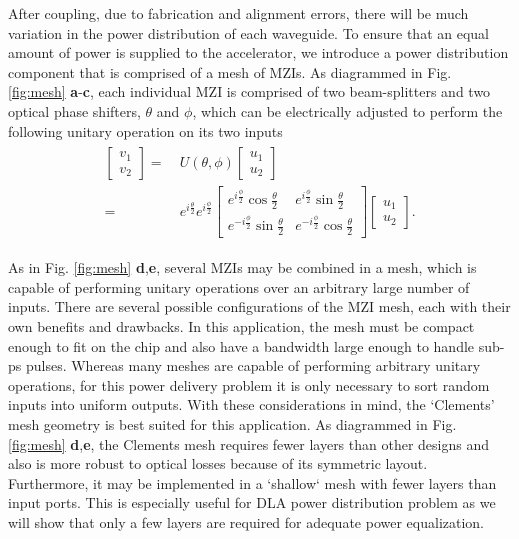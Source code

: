 \documentclass[%
 reprint,
 amsmath,amssymb,
 aps,
prstab,
floatfix,
]{revtex4-1}
\begin{document}
After coupling, due to fabrication and alignment errors, there will be much variation in the power distribution of each waveguide. To ensure that an equal amount of power is supplied to the accelerator, we introduce a power distribution component that is comprised of a mesh of MZIs.  As diagrammed in Fig. \ref{fig:mesh} \textbf{a}-\textbf{c}, each individual MZI is comprised of two beam-splitters and two optical phase shifters, $\theta$ and $\phi$, which can be electrically adjusted to perform the following unitary operation on its two inputs \cite{reck_experimental_1994,clements_optimal_2016,shen_deep_2017}
\begin{align}
\begin{split}
    \begin{bmatrix}
      v_1 \\ v_2
    \end{bmatrix}
    =&~U(\theta, \phi) 
    \begin{bmatrix}
      u_1 \\ u_2
    \end{bmatrix}
    \\
    =&~e^{i\frac{\theta}{2}} e^{i\frac{\phi}{2}}
    \begin{bmatrix}
      e^{i\frac{\phi}{2}}\cos{\frac{\theta}{2}} &
      e^{i\frac{\phi}{2}}\sin{\frac{\theta}{2}} \\
      e^{-i\frac{\phi}{2}}\sin{\frac{\theta}{2}} & 
      e^{-i\frac{\phi}{2}}\cos{\frac{\theta}{2}}
    \end{bmatrix}
    \begin{bmatrix}
      u_1 \\ u_2
    \end{bmatrix}.
\end{split}
\end{align}
%

As in Fig. \ref{fig:mesh} \textbf{d},\textbf{e}, several MZIs may be combined in a mesh, which is capable of performing unitary operations over an arbitrary large number of inputs.  There are several possible configurations of the MZI mesh, each with their own benefits and drawbacks.  In this application, the mesh must be compact enough to fit on the chip and also have a bandwidth large enough to handle sub-ps pulses.  Whereas many meshes are capable of performing arbitrary unitary operations, for this power delivery problem it is only necessary to sort random inputs into uniform outputs.  With these considerations in mind, the `Clements' mesh geometry \cite{clements_optimal_2016} is best suited for this application.   As diagrammed in Fig. \ref{fig:mesh} \textbf{d},\textbf{e}, the Clements mesh requires fewer layers than other designs \cite{reck_experimental_1994} and also is more robust to optical losses because of its symmetric layout.  Furthermore, it may be implemented in a `shallow` mesh with fewer layers than input ports.  This is especially useful for DLA power distribution problem as we will show that only a few layers are required for adequate power equalization.  %
\end{document}
